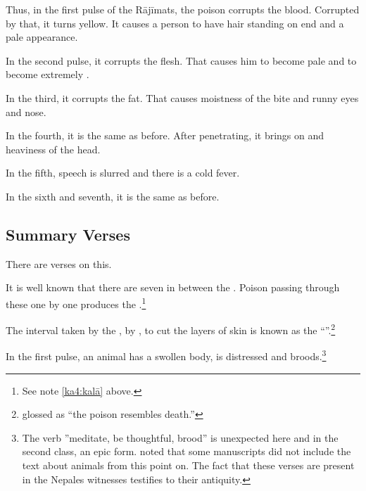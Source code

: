 \begin{translation}
Thus, in the first pulse of the Rājīmats, the poison corrupts the blood. 
Corrupted by that, it turns yellow.  It causes a person to have hair standing on 
end and a pale appearance. 

In the second pulse, it corrupts the flesh. That causes him to become
pale and to become extremely .

In the third, it corrupts the fat.  That causes moistness of the bite and runny eyes 
and nose. 

In the fourth, it is the same as before.  After penetrating, it brings on 
 and heaviness of the head.

In the fifth, speech is slurred and there is a cold fever.

In the sixth and seventh, it is the same as before. 



\subsection{Summary Verses}

\item[40]
There are verses on this.

\begin{sloka}
    \label{ka4:kalā-vega}
It is well known that there are seven  in
between the .  Poison passing through these one
by one produces the .\footnote{See note 
\ref{ka4:kalā} above.}
\end{sloka}


\item[41]
\begin{sloka}
The interval taken by the ,  by , to cut the layers of 
    skin is
known as the “”.\footnote{ glossed  as
     “the poison resembles death.”}
\end{sloka}


\item[42]

\begin{sloka}
    In the first pulse, an animal has a swollen body, is distressed and
broods.\footnote{The verb \root{} ”meditate, be
    thoughtful, brood” is unexpected here and in the  second class, an
    epic form.  noted that some manuscripts did not
    include the text about animals from this point on.  The fact that
    these verses are present in the Nepales witnesses testifies to their
    antiquity.}
    

\end{sloka}
\end{translation}
